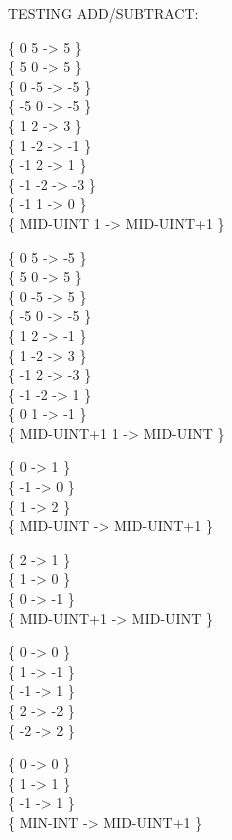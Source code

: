 \begin{tt}
TESTING ADD/SUBTRACT: \word{+} \word{-}    

\{        0  5 \word{+} ->          5 \} \\
\{        5  0 \word{+} ->          5 \} \\
\{        0 -5 \word{+} ->         -5 \} \\
\{       -5  0 \word{+} ->         -5 \} \\
\{        1  2 \word{+} ->          3 \} \\
\{        1 -2 \word{+} ->         -1 \} \\
\{       -1  2 \word{+} ->          1 \} \\
\{       -1 -2 \word{+} ->         -3 \} \\
\{       -1  1 \word{+} ->          0 \} \\
\{ MID-UINT  1 \word{+} -> MID-UINT+1 \}

\{          0  5 \word{-} ->       -5 \} \\
\{          5  0 \word{-} ->        5 \} \\
\{          0 -5 \word{-} ->        5 \} \\
\{         -5  0 \word{-} ->       -5 \} \\
\{          1  2 \word{-} ->       -1 \} \\
\{          1 -2 \word{-} ->        3 \} \\
\{         -1  2 \word{-} ->       -3 \} \\
\{         -1 -2 \word{-} ->        1 \} \\
\{          0  1 \word{-} ->       -1 \} \\
\{ MID-UINT+1  1 \word{-} -> MID-UINT \}

\{        0  ->          1 \} \\
\{       -1  ->          0 \} \\
\{        1  ->          2 \} \\
\{ MID-UINT  -> MID-UINT+1 \}

\{          2  ->        1 \} \\
\{          1  ->        0 \} \\
\{          0  ->       -1 \} \\
\{ MID-UINT+1  -> MID-UINT \}

\{  0  ->  0 \} \\
\{  1  -> -1 \} \\
\{ -1  ->  1 \} \\
\{  2  -> -2 \} \\
\{ -2  ->  2 \}

\{       0  ->          0 \} \\
\{       1  ->          1 \} \\
\{      -1  ->          1 \} \\
\{ MIN-INT  -> MID-UINT+1 \}
\end{tt}

